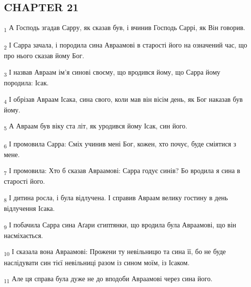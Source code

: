 \subsection{CHAPTER 21}
\begin{tcolorbox}
\textsubscript{1} А Господь згадав Сарру, як сказав був, і вчинив Господь Саррі, як Він говорив.
\end{tcolorbox}
\begin{tcolorbox}
\textsubscript{2} І Сарра зачала, і породила сина Авраамові в старості його на означений час, що про нього сказав йому Бог.
\end{tcolorbox}
\begin{tcolorbox}
\textsubscript{3} І назвав Авраам ім'я синові своєму, що вродився йому, що Сарра йому породила: Ісак.
\end{tcolorbox}
\begin{tcolorbox}
\textsubscript{4} І обрізав Авраам Ісака, сина свого, коли мав він вісім день, як Бог наказав був йому.
\end{tcolorbox}
\begin{tcolorbox}
\textsubscript{5} А Авраам був віку ста літ, як уродився йому Ісак, син його.
\end{tcolorbox}
\begin{tcolorbox}
\textsubscript{6} І промовила Сарра: Сміх учинив мені Бог, кожен, хто почує, буде сміятися з мене.
\end{tcolorbox}
\begin{tcolorbox}
\textsubscript{7} І промовила: Хто б сказав Авраамові: Сарра годує синів? Бо вродила я сина в старості його.
\end{tcolorbox}
\begin{tcolorbox}
\textsubscript{8} І дитина росла, і була відлучена. І справив Авраам велику гостину в день відлучення Ісака.
\end{tcolorbox}
\begin{tcolorbox}
\textsubscript{9} І побачила Сарра сина Аґари єгиптянки, що вродила була Авраамові, що він насміхається.
\end{tcolorbox}
\begin{tcolorbox}
\textsubscript{10} І сказала вона Авраамові: Прожени ту невільницю та сина її, бо не буде наслідувати син тієї невільниці разом із сином моїм, із Ісаком.
\end{tcolorbox}
\begin{tcolorbox}
\textsubscript{11} Але ця справа була дуже не до вподоби Авраамові через сина його.
\end{tcolorbox}
